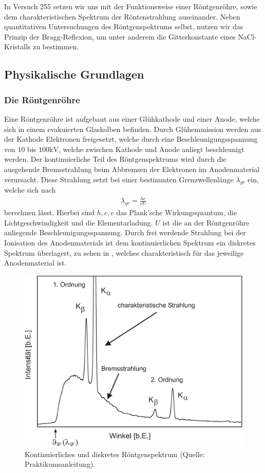 In Versuch 255 setzen wir uns mit der Funktionsweise einer Röntgenröhre, sowie dem charakteristischen Spektrum der Röntenstrahlung auseinander. Neben quantitativen Untersuchungen des Röntgenspektrums selbst, nutzen wir das Prinzip der Bragg-Reflexion, um unter anderem die Gitterkonstante eines NaCl-Kristalls zu bestimmen.

\subsection{Physikalische Grundlagen}

\subsubsection*{Die Röntgenröhre}
Eine Röntgenröhre ist aufgebaut aus einer Glühkathode und einer Anode, welche sich in einem evakuierten Glaskolben befinden. Durch Glühemmission werden aus der Kathode Elektronen freigesetzt, welche durch eine Beschleunigungsspannung von $10$ bis $100\si{\kilo\volt}$, welche zwischen Kathode und Anode anliegt beschleunigt werden. Der kontinuierliche Teil des Röntgenspektrums wird durch die ausgehende Bremsstrahlung beim Abbremsen der Elektronen im Anodenmaterial verursacht. Diese Strahlung setzt bei einer bestimmten Grenzwellenlänge $\lambda_{gr}$ ein, welche sich nach
\begin{align}
  \lambda_{gr} = \frac{hc}{eU}\label{eq:grenzfreq}
\end{align}
berechnen lässt. Hierbei sind $h,c,e$ das Plank'sche Wirkungsquantum, die Lichtgeschwindigkeit und die Elementarladung. $U$ ist die an der Röntgenröhre anliegende Beschleunigungsspannung. Durch frei werdende Strahlung bei der Ionisation des Anodenmaterials ist dem kontinuierlichen Spektrum ein diskretes Spektrum überlagert, zu sehen in , welches charakteristisch für das jeweilige Anodenmaterial ist. 

\begin{figure}[H]
  \centering
  \includegraphics[width=.75\textwidth]{files/roentgenspektrum.png}
  \caption{Kontinuierliches und diskretes Röntgenspektrum (Quelle: Praktikumsanleitung).}
  \label{fig:roentgenspektrum}
\end{figure}

